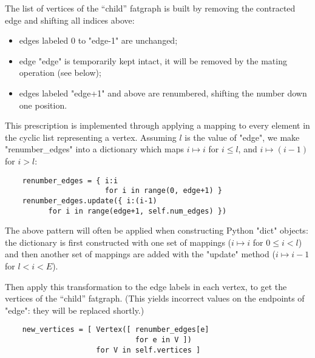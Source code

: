 The list of vertices of the ``child'' fatgraph is built by removing
the contracted edge and shifting all indices above:
\begin{itemize}
\item edges labeled 0 to "edge-1" are unchanged;
\item edge "edge" is temporarily kept intact, it will be
  removed by the mating operation (see below);
\item edges labeled "edge+1" and above are renumbered, 
  shifting the number down one position.
\end{itemize}
This prescription is implemented through applying a mapping to every
element in the cyclic list representing a vertex.  Assuming $l$ is the
value of "edge", we make "renumber_edges" into a dictionary which
maps $i \mapsto i$ for $i \leq l$, and $i \mapsto (i-1)$ for $i > l$:
\begin{lstlisting}
    renumber_edges = { i:i 
                       for i in range(0, edge+1) }
    renumber_edges.update({ i:(i-1)
          for i in range(edge+1, self.num_edges) })
\end{lstlisting}
The above pattern will often be applied when constructing Python
"dict" objects: the dictionary is first constructed with one set of
mappings ($i \mapsto i$ for $0 \leq i < l$) and then another set of
mappings are added with the "update" method ($i \mapsto i-1$ for $l <
i < E$).

Then apply this transformation to the edge labels in each vertex, to
get the vertices of the ``child'' fatgraph. (This yields incorrect
values on the endpoints of "edge": they will be replaced shortly.)
\begin{lstlisting}
    new_vertices = [ Vertex([ renumber_edges[e] 
                              for e in V ])
                     for V in self.vertices ]

\end{lstlisting}

